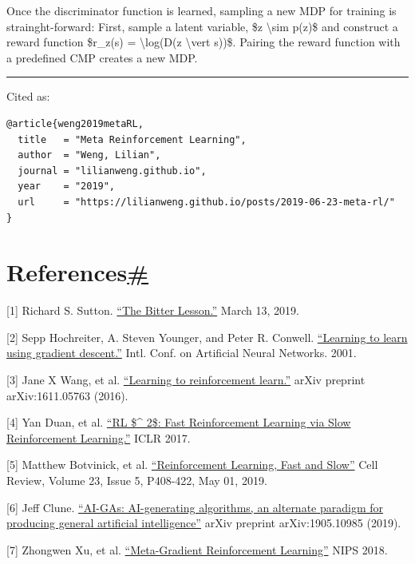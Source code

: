 Once the discriminator function is learned, sampling a new MDP for training is strainght-forward: First, sample a latent variable, \$z \textbackslash sim p(z)\$ and construct a reward function \$r\_z(s) = \textbackslash log(D(z \textbackslash vert s))\$. Pairing the reward function with a predefined CMP creates a new MDP.

\begin{center}\rule{0.5\linewidth}{0.5pt}\end{center}

Cited as:

\begin{verbatim}
@article{weng2019metaRL,
  title   = "Meta Reinforcement Learning",
  author  = "Weng, Lilian",
  journal = "lilianweng.github.io",
  year    = "2019",
  url     = "https://lilianweng.github.io/posts/2019-06-23-meta-rl/"
}
\end{verbatim}

\section{\texorpdfstring{References\hyperref[references]{\#}}{References\#}}\label{references}

{[}1{]} Richard S. Sutton. \href{http://incompleteideas.net/IncIdeas/BitterLesson.html}{``The Bitter Lesson.''} March 13, 2019.

{[}2{]} Sepp Hochreiter, A. Steven Younger, and Peter R. Conwell. \href{http://snowedin.net/tmp/Hochreiter2001.pdf}{``Learning to learn using gradient descent.''} Intl. Conf. on Artificial Neural Networks. 2001.

{[}3{]} Jane X Wang, et al. \href{https://arxiv.org/abs/1611.05763}{``Learning to reinforcement learn.''} arXiv preprint arXiv:1611.05763 (2016).

{[}4{]} Yan Duan, et al. \href{https://arxiv.org/abs/1611.02779}{``RL \$\^{} 2\$: Fast Reinforcement Learning via Slow Reinforcement Learning.''} ICLR 2017.

{[}5{]} Matthew Botvinick, et al. \href{https://www.cell.com/trends/cognitive-sciences/fulltext/S1364-6613(19)30061-0}{``Reinforcement Learning, Fast and Slow''} Cell Review, Volume 23, Issue 5, P408-422, May 01, 2019.

{[}6{]} Jeff Clune. \href{https://arxiv.org/abs/1905.10985}{``AI-GAs: AI-generating algorithms, an alternate paradigm for producing general artificial intelligence''} arXiv preprint arXiv:1905.10985 (2019).

{[}7{]} Zhongwen Xu, et al. \href{http://papers.nips.cc/paper/7507-meta-gradient-reinforcement-learning.pdf}{``Meta-Gradient Reinforcement Learning''} NIPS 2018.

